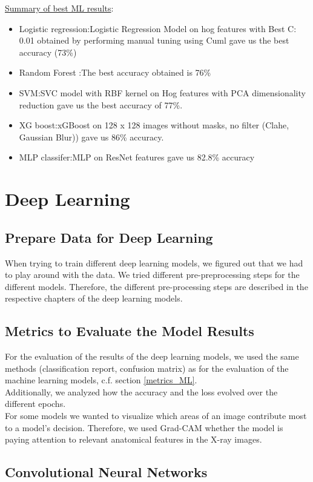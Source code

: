 \documentclass{article}
\begin{document}
\underline{Summary of best ML results}:
\begin{itemize}
    \item Logistic regression:Logistic Regression Model on hog features with Best C: 0.01 obtained by performing manual tuning using Cuml gave us the best accuracy (73\%)
    \item Random Forest :The best accuracy obtained is 76\%
    \item SVM:SVC model with RBF kernel on Hog features with PCA dimensionality reduction gave us the best accuracy of 77\%.
    \item XG boost:xGBoost on 128 x 128 images without masks, no filter (Clahe, Gaussian Blur)) gave us 86\% accuracy.
    \item MLP classifer:MLP on ResNet features gave us 82.8\% accuracy
\end{itemize}


\newpage

\section{Deep Learning}

\subsection{Prepare Data for Deep Learning}
When trying to train different deep learning models, we figured out that we had to play around with the data. We tried different pre-preprocessing steps for the different models. Therefore, the different pre-processing steps are described in the respective chapters of the deep learning models.

\subsection{Metrics to Evaluate the Model Results}
For the evaluation of the results of the deep learning models, we used the same methods (classification report, confusion matrix) as for the evaluation of the machine learning models, c.f. section \ref{metrics_ML}. \\
Additionally, we analyzed how the accuracy and the loss evolved over the different epochs. \\
For some models we wanted to visualize which areas of an image contribute most to a model's decision. Therefore, we used Grad-CAM whether the model is paying attention to relevant anatomical features in the X-ray images.
\subsection{Convolutional Neural Networks}
\end{document}
